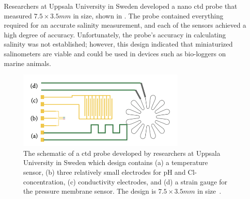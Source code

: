 Researchers at Uppsala University in Sweden developed a nano \gls{ctd} probe that measured $7.5 \times 3.5mm$ in size, shown in .
The probe contained everything required for an accurate salinity measurement, and each of the sensors achieved a high degree of accuracy.
Unfortunately, the probe's accuracy in calculating salinity was not established; however, this design indicated that miniaturized salinometers are viable and could be used in devices such as bio-loggers on marine animals.~\cite{jonsson_chip_based_salinity_2013}
\begin{figure}[ht]
    \centering
    \includegraphics[width=0.75\textwidth]{Figures/nano_ctd}
    \caption{The schematic of a \gls{ctd} probe developed by researchers at Uppsala University in Sweden which design contains (a) a temperature sensor, (b) three relatively small electrodes for pH and Cl- concentration, (c) conductivity electrodes, and (d) a strain gauge for the pressure membrane sensor. The design is $7.5 \times 3.5 mm$ in size~\cite{jonsson_chip_based_salinity_2013}.}
    \label{fig:nano-ctd} %
\end{figure}



